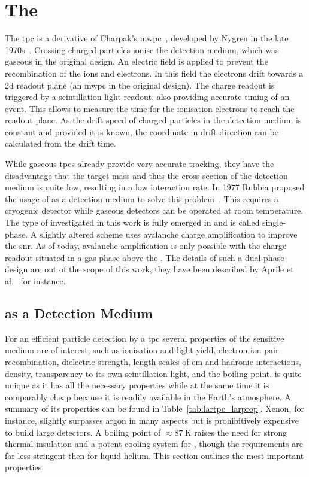 \chapter{The }
\label{chap:lartpc}


The \gls{tpc} is a derivative of Charpak's \gls{mwpc}~\cite{mwpc}, developed by Nygren in the late 1970s~\cite{nygrenTPC}.
Crossing charged particles ionise the detection medium, which was gaseous in the original design.
An electric field is applied to prevent the recombination of the ions and electrons.
In this field the electrons drift towards a \gls{2d} readout plane (an \gls{mwpc} in the original design).
The charge readout is triggered by a scintillation light readout, also providing accurate timing of an event.
This allows to measure the time for the ionisation electrons to reach the readout plane.
As the drift speed of charged particles in the detection medium is constant and provided it is known, the coordinate in drift direction can be calculated from the drift time.

While gaseous \glspl{tpc} already provide very accurate tracking, they have the disadvantage that the target mass and thus the cross-section of the detection medium is quite low, resulting in a low interaction rate.
In 1977 Rubbia proposed the usage of \lar{} as a detection medium to solve this problem~\cite{lartpc}.
This requires a cryogenic detector while gaseous detectors can be operated at room temperature.
The type of \lartpc{} investigated in this work is fully emerged in \lar{} and is called single-phase.
A slightly altered scheme uses avalanche charge amplification to improve the \gls{snr}.
As of today, avalanche amplification is only possible with the charge readout situated in a gas phase above the \lar{}.
The details of such a dual-phase design are out of the scope of this work, they have been described by Aprile et al.~\cite{NobleGasDetectors} for instance.


\section{ as a Detection Medium}
\label{sec:lartpc_lar}

For an efficient particle detection by a \gls{tpc} several properties of the sensitive medium are of interest, such as ionisation and light yield, electron-ion pair recombination, dielectric strength, length scales of \gls{em} and hadronic interactions, density, transparency to its own scintillation light, and the boiling point.
\lar{} is quite unique as it has all the necessary properties while at the same time it is comparably cheap because it is readily available in the Earth's atmosphere.
A summary of its properties can be found in Table~\ref{tab:lartpc_larprop}.
Xenon, for instance, slightly surpasses argon in many aspects but is prohibitively expensive to build large detectors.
A boiling point of $\approx \SI{87}{\kelvin}$ raises the need for strong thermal insulation and a potent cooling system for \lar{}, though the requirements are far less stringent then for liquid helium.
This section outlines the most important \lar{} properties.

